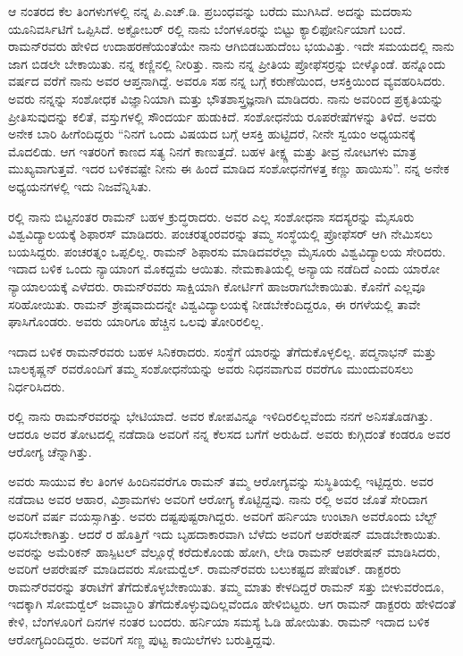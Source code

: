 ಆ ನಂತರದ ಕೆಲ ತಿಂಗಳುಗಳಲ್ಲಿ ನನ್ನ ಪಿ.ಎಚ್.ಡಿ. ಪ್ರಬಂಧವನ್ನು ಬರೆದು ಮುಗಿಸಿದೆ. ಅದನ್ನು ಮದರಾಸು ಯೂನಿವರ್ಸಿಟಿಗೆ ಒಪ್ಪಿಸಿದೆ. ಅಕ್ಟೋಬರ್ ರಲ್ಲಿ ನಾನು ಬೆಂಗಳೂರನ್ನು ಬಿಟ್ಟು ಕ್ಯಾಲಿಫೋರ್ನಿಯಾಗೆ ಬಂದೆ. ರಾಮನ್‍ರವರು ಹೇಳಿದ ಉದಾಹರಣೆಯಂತೆಯೇ ನಾನು ಆಗಿಬಿಡಬಹುದೆಂಬ ಭಯವಿತ್ತು. ಇದೇ ಸಮಯದಲ್ಲಿ ನಾನು ಜಾಗ ಬಿಡಲೇ ಬೇಕಾಯಿತು. ನನ್ನ ಕಣ್ಣಿನಲ್ಲಿ ನೀರಿತ್ತು. ನಾನು ನನ್ನ ಪ್ರೀತಿಯ ಪ್ರೋಫೆಸರ್‍ರನ್ನು ಬೀಳ್ಕೊಂಡೆ. ಹನ್ನೊಂದು ವರ್ಷದ ವರೆಗೆ ನಾನು ಅವರ ಆಪ್ತನಾಗಿದ್ದೆ. ಅವರೂ ಸಹ ನನ್ನ ಬಗ್ಗೆ ಕರುಣೆಯಿಂದ, ಆಸಕ್ತಿಯಿಂದ ವ್ಯವಹರಿಸಿದರು. ಅವರು ನನ್ನನ್ನು ಸಂಶೋಧಕ ವಿಜ್ಞಾನಿಯಾಗಿ ಮತ್ತು ಭೌತಶಾಸ್ತ್ರಜ್ಞನಾಗಿ ಮಾಡಿದರು. ನಾನು ಅವರಿಂದ ಪ್ರಕೃತಿಯನ್ನು ಪ್ರೀತಿಸುವುದನ್ನು ಕಲಿತೆ, ವಸ್ತುಗಳಲ್ಲಿ ಸೌಂದರ್ಯ ಹುಡುಕಿದೆ. ಸಂಶೋಧನೆಯ ರೂಪರೇಷೆಗಳನ್ನು ತಿಳಿದೆ. ಅವರು ಅನೇಕ ಬಾರಿ ಹೀಗೆಂದಿದ್ದರು  “ನಿನಗೆ ಒಂದು ವಿಷಯದ ಬಗ್ಗೆ ಆಸಕ್ತಿ ಹುಟ್ಟಿದರೆ, ನೀನೇ ಸ್ವಯಂ ಅಧ್ಯಯನಕ್ಕೆ ಮೊದಲಿಡು. ಆಗ ಇತರರಿಗೆ ಕಾಣದ ಸತ್ಯ ನಿನಗೆ ಕಾಣುತ್ತದೆ. ಬಹಳ ತೀಕ್ಷ್ಣ ಮತ್ತು ತೀವ್ರ ನೋಟಗಳು ಮಾತ್ರ ಮುಖ್ಯವಾಗುತ್ತವೆ. ಇದರ ಬಳಿಕವಷ್ಟೇ ನೀನು ಈ ಹಿಂದೆ ಮಾಡಿದ ಸಂಶೋಧನೆಗಳತ್ತ ಕಣ್ಣು ಹಾಯಿಸು”. ನನ್ನ ಅನೇಕ ಅಧ್ಯಯನಗಳಲ್ಲಿ ಇದು ನಿಜವೆನ್ನಿಸಿತು.

\newpage

ರಲ್ಲಿ ನಾನು ಬಿಟ್ಟನಂತರ ರಾಮನ್ ಬಹಳ ಕ್ರುದ್ಧರಾದರು. ಅವರ ಎಲ್ಲ ಸಂಶೋಧನಾ ಸದಸ್ಯರನ್ನು ಮೈಸೂರು ವಿಶ್ವವಿದ್ಯಾಲಯಕ್ಕೆ ಶಿಫಾರಸ್ ಮಾಡಿದರು. ಪಂಚರತ್ನಂರವರನ್ನು ತಮ್ಮ ಸಂಸ್ಥೆಯಲ್ಲಿ ಪ್ರೋಫೆಸರ್ ಆಗಿ ನೇಮಿಸಲು ಬಯಸಿದ್ದರು. ಪಂಚರತ್ನಂ ಒಪ್ಪಲಿಲ್ಲ. ರಾಮನ್ ಶಿಫಾರಸು ಮಾಡಿದವರೆಲ್ಲಾ ಮೈಸೂರು ವಿಶ್ವವಿದ್ಯಾಲಯ ಸೇರಿದರು. ಇದಾದ ಬಳಿಕ ಒಂದು ನ್ಯಾಯಾಂಗ ಮೊಕದ್ದಮೆ ಆಯಿತು. ನೇಮಕಾತಿಯಲ್ಲಿ ಅನ್ಯಾಯ ನಡೆದಿದೆ ಎಂದು ಯಾರೋ ನ್ಯಾಯಾಲಯಕ್ಕೆ ಎಳೆದರು. ರಾಮನ್‍ರವರು ಸಾಕ್ಷಿಯಾಗಿ ಕೋರ್ಟಿಗೆ ಹಾಜರಾಗಬೇಕಾಯಿತು. ಕೊನೆಗೆ ಎಲ್ಲವೂ ಸರಿಹೋಯಿತು. ರಾಮನ್ ಶ್ರೇಷ್ಠವಾದುದನ್ನೇ ವಿಶ್ವವಿದ್ಯಾಲಯಕ್ಕೆ ನೀಡ\break ಬೇಕೆಂದಿದ್ದರೂ, ಈ ರಗಳೆಯಲ್ಲಿ ತಾವೇ ಘಾಸಿಗೊಂಡರು. ಅವರು ಯಾರಿಗೂ ಹೆಚ್ಚಿನ ಒಲವು ತೋರಿರಲಿಲ್ಲ.

ಇದಾದ ಬಳಿಕ ರಾಮನ್‍ರವರು ಬಹಳ ಸಿನಿಕರಾದರು. ಸಂಸ್ಥೆಗೆ ಯಾರನ್ನು ತೆಗೆದುಕೊಳ್ಳಲಿಲ್ಲ. ಪದ್ಮನಾಭನ್ ಮತ್ತು ಬಾಲಕೃಷ್ಣನ್ ರವರೊಂದಿಗೆ ತಮ್ಮ ಸಂಶೋಧನೆಯನ್ನು ಅವರು ನಿಧನವಾಗುವ  ರವರೆಗೂ ಮುಂದುವರಿಸಲು ನಿರ್ಧರಿಸಿದರು.

ರಲ್ಲಿ ನಾನು ರಾಮನ್‍ರವರನ್ನು ಭೇಟಿಯಾದೆ. ಅವರ ಕೋಪವಿನ್ನೂ ಇಳಿದಿರಲಿಲ್ಲವೆಂದು ನನಗೆ ಅನಿಸತೊಡಗಿತ್ತು. ಆದರೂ ಅವರ ತೋಟದಲ್ಲಿ ನಡೆದಾಡಿ ಅವರಿಗೆ ನನ್ನ ಕೆಲಸದ ಬಗೆಗೆ ಅರುಹಿದೆ. ಅವರು ಕುಗ್ಗಿದಂತೆ ಕಂಡರೂ ಅವರ ಆರೋಗ್ಯ ಚೆನ್ನಾಗಿತ್ತು.

ಅವರು ಸಾಯುವ ಕೆಲ ತಿಂಗಳ ಹಿಂದಿನವರೆಗೂ ರಾಮನ್ ತಮ್ಮ ಆರೋಗ್ಯವನ್ನು ಸುಸ್ಥಿತಿಯಲ್ಲಿ ಇಟ್ಟಿದ್ದರು. ಅವರ ನಡೆದಾಟ ಅವರ ಆಹಾರ, ವಿಶ್ರಾಮಗಳು ಅವರಿಗೆ ಆರೋಗ್ಯ ಕೊಟ್ಟಿದ್ದವು. ನಾನು ರಲ್ಲಿ ಅವರ ಜೊತೆ ಸೇರಿದಾಗ ಅವರಿಗೆ  ವರ್ಷ ವಯಸ್ಸಾಗಿತ್ತು. ಅವರು ದಷ್ಟಪುಷ್ಟರಾಗಿದ್ದರು. ಅವರಿಗೆ ಹರ್ನಿಯಾ ಉಂಟಾಗಿ ಅವರೊಂದು ಬೆಲ್ಟ್ ಧರಿಸಬೇಕಾಗಿತ್ತು. ಆದರೆ ರ ಹೊತ್ತಿಗೆ ಇದು ಬೃಹದಾಕಾರವಾಗಿ ಬೆಳೆದು ಅವರಿಗೆ ಆಪರೇಷನ್ ಮಾಡಬೇಕಾಯಿತು. ಅವರನ್ನು ಅಮೆರಿಕನ್ ಹಾಸ್ಪಿಟಲ್ ವೆಲ್ಲೂರ್‍ಗೆ ಕರೆದುಕೊಂಡು ಹೋಗಿ, ಲೇಡಿ ರಾಮನ್ ಆಪರೇಷನ್ ಮಾಡಿಸಿದರು, ಅವರಿಗೆ ಆಪರೇಷನ್ ಮಾಡಿದವರು ಸೋಮರ್‍ವೆಲ್. ರಾಮನ್‍ರವರು ಬಲುಕಷ್ಟದ ಪೇಷೆಂಟ್. ಡಾಕ್ಟರರು ರಾಮನ್‍ರವರನ್ನು ತರಾಟೆಗೆ ತೆಗೆದುಕೊಳ್ಳಬೇಕಾಯಿತು. ತಮ್ಮ ಮಾತು ಕೇಳದಿದ್ದರೆ ರಾಮನ್ ಸತ್ತು ಬೀಳುವರೆಂದೂ, ಇದಕ್ಕಾಗಿ ಸೋಮರ್‍ವೆಲ್ ಜವಾಬ್ದಾರಿ ತೆಗೆದುಕೊಳ್ಳುವುದಿಲ್ಲವೆಂದೂ ಹೇಳಿಬಿಟ್ಟರು. ಆಗ ರಾಮನ್ ಡಾಕ್ಟರರು ಹೇಳಿದಂತೆ ಕೇಳಿ, ಬೆಂಗಳೂರಿಗೆ  ದಿನಗಳ ನಂತರ ಬಂದರು. ಹರ್ನಿಯಾ ಸಮಸ್ಯೆ ಓಡಿ ಹೋಯಿತು. ರಾಮನ್ ಇದಾದ ಬಳಿಕ ಆರೋಗ್ಯದಿಂದಿದ್ದರು. ಅವರಿಗೆ ಸಣ್ಣ ಪುಟ್ಟ ಕಾಯಿಲೆಗಳು ಬರುತ್ತಿದ್ದವು.

